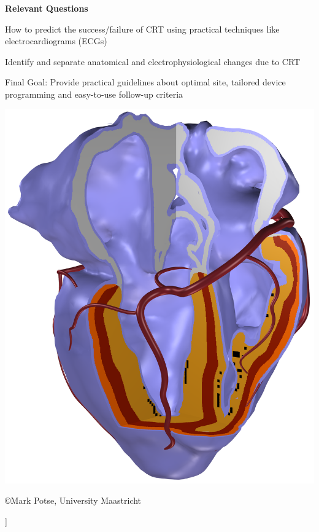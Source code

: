 \documentclass[12pt]{ICSPoster}
\begin{document}
\begin{posterbox}
\begin{headerbox}[
        title=Background: Understanding Cardiac Resynchronization Therapy,
        height=0.19\textheight]
\begin{minipage}{0.55\textwidth}
        \textbf{Relevant Questions}
        \begin{compactitem}
          \item How to predict the success/failure of CRT using practical techniques like electrocardiograms (ECGs)
          \item Identify and separate anatomical and electrophysiological changes due to CRT
          \item Final Goal: Provide practical guidelines about optimal site, tailored device programming
                and easy-to-use follow-up criteria
        \end{compactitem}
      \end{minipage}
           \begin{minipage}{0.25\textwidth}\sf
        \vspace{0.5cm}
        \hspace{1cm}
        \includegraphics[height=0.9\textwidth]{anatomy.png}
        \begin{flushright}
        {\tiny \copyright Mark Potse, University Maastricht}
        \end  {flushright}
      \end{minipage}
      \end{headerbox}]
 \end{posterbox}
\end{document}
